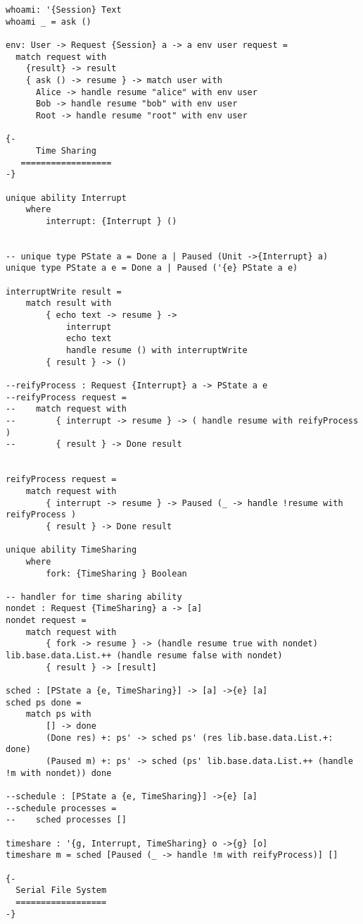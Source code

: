 \documentclass[logo,bsc,singlespacing,parskip]{infthesis}
\begin{document}
\begin{lstlisting}[language=unison]
whoami: '{Session} Text
whoami _ = ask ()
 
env: User -> Request {Session} a -> a env user request =
  match request with
    {result} -> result
    { ask () -> resume } -> match user with
      Alice -> handle resume "alice" with env user
      Bob -> handle resume "bob" with env user 
      Root -> handle resume "root" with env user
  
{-
      Time Sharing
   ==================
-}

unique ability Interrupt
    where
        interrupt: {Interrupt } ()


-- unique type PState a = Done a | Paused (Unit ->{Interrupt} a)
unique type PState a e = Done a | Paused ('{e} PState a e)

interruptWrite result =
    match result with
        { echo text -> resume } -> 
            interrupt
            echo text 
            handle resume () with interruptWrite
        { result } -> ()

--reifyProcess : Request {Interrupt} a -> PState a e
--reifyProcess request =
--    match request with
--        { interrupt -> resume } -> ( handle resume with reifyProcess )
--        { result } -> Done result


reifyProcess request =
    match request with
        { interrupt -> resume } -> Paused (_ -> handle !resume with reifyProcess )
        { result } -> Done result

unique ability TimeSharing
    where
        fork: {TimeSharing } Boolean

-- handler for time sharing ability
nondet : Request {TimeSharing} a -> [a]
nondet request =
    match request with
        { fork -> resume } -> (handle resume true with nondet) lib.base.data.List.++ (handle resume false with nondet)
        { result } -> [result]

sched : [PState a {e, TimeSharing}] -> [a] ->{e} [a]
sched ps done = 
    match ps with
        [] -> done
        (Done res) +: ps' -> sched ps' (res lib.base.data.List.+: done)
        (Paused m) +: ps' -> sched (ps' lib.base.data.List.++ (handle !m with nondet)) done

--schedule : [PState a {e, TimeSharing}] ->{e} [a]
--schedule processes =
--    sched processes []

timeshare : '{g, Interrupt, TimeSharing} o ->{g} [o]
timeshare m = sched [Paused (_ -> handle !m with reifyProcess)] []

{-
  Serial File System
  ==================
-}


\end{lstlisting}
\end{document}
